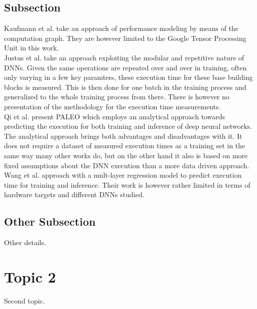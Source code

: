 \subsection{Subsection}
Kaufmann et al. take an approach of performance modeling by means of the computation graph. They are
however limited to the Google Tensor Processing Unit in this work. \\
Justus et al. take an approach exploiting the modular and repetitive nature of DNNs. Given the same operations
are repeated over and over in training, often only varying in a few key paramters, these execution time for
these base building blocks is measured. This is then done for one batch in the training process and
generalized to the whole training process from there. There is however no presentation of the 
methodology for the execution time measurements. \\
Qi et al. present PALEO which employs an analytical approach towards predicting the execution for both
training and inference of deep neural networks. The analytical approach brings both advantages and disadvantages
with it. It does not require a dataset of measured execution times as a training set in the same way many 
other works do, but on the other hand it also is based on more fixed assumptions about the DNN execution 
than a more data driven approach. \\
Wang et al. approach with a mult-layer regression model to predict execution time for training and inference.
Their work is however rather limited in terms of hardware targets and different DNNs studied. \\

\subsection{Other Subsection}
Other details.

\section{Topic 2}
Second topic.
